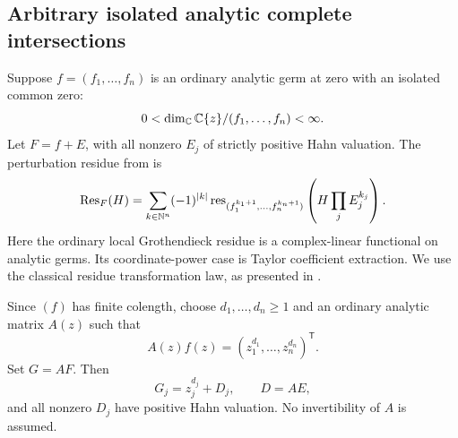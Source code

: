 \documentclass[11pt,letterpaper]{article}
\theoremstyle{definition}
\theoremstyle{remark}
\newcommand{\N}{\mathbb N}\newcommand{\Z}{\mathbb Z}
\newcommand{\res}{\operatorname{res}}\newcommand{\Wind}{\operatorname{Wind}}
\numberwithin{equation}{section}
\begin{document}
\subsection{Arbitrary isolated analytic complete intersections}
Suppose $f=(f_1,\ldots,f_n)$ is an ordinary analytic germ at zero with an isolated common zero:
\[
 0<\dim_\mathbb C\mathbb C\{z\}/(f_1,\ldots,f_n)<\infty.
\]
Let $F=f+E$, with all nonzero $E_j$ of strictly positive Hahn valuation. The perturbation residue from \cite{Geometry} is
\begin{equation}\label{eq:generalres}
 \Res_F(H)=\sum_{k\in\N^n}(-1)^{|k|}
 \res_{(f_1^{k_1+1},\ldots,f_n^{k_n+1})}
 \left(H\prod_jE_j^{k_j}\right).
\end{equation}
Here the ordinary local Grothendieck residue is a complex-linear functional on analytic germs. Its coordinate-power case is Taylor coefficient extraction. We use the classical residue transformation law, as presented in \cite{Tsikh,CDS}.

Since $(f)$ has finite colength, choose $d_1,\ldots,d_n\ge1$ and an ordinary analytic matrix $A(z)$ such that
\begin{equation}\label{eq:transformmatrix}
 A(z)f(z)=(z_1^{d_1},\ldots,z_n^{d_n})^{\mathsf T}.
\end{equation}
Set $G=AF$. Then
\[
 G_j=z_j^{d_j}+D_j,\qquad D=AE,
\]
and all nonzero $D_j$ have positive Hahn valuation. No invertibility of $A$ is assumed.
\end{document}
